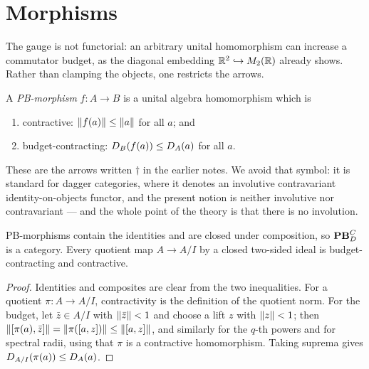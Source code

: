 \section{Morphisms}
\label{sec:morphisms}

The gauge is not functorial: an arbitrary unital homomorphism can increase a
commutator budget, as the diagonal embedding $\mathbb{R}^2\hookrightarrow M_2(\mathbb{R})$
already shows.  Rather than clamping the objects, one restricts the arrows.

\begin{definition}[PB-morphisms]\label{def:pb-morphism}
A \emph{PB-morphism} $f:A\to B$ is a unital algebra homomorphism which is
\begin{enumerate}
\item[(i)] contractive: $\left\lVert f(a)\right\rVert\le\left\lVert a\right\rVert$ for all $a$; and
\item[(ii)] budget-contracting: $D_B(f(a))\le D_A(a)$ for all $a$.
\end{enumerate}
\end{definition}

\begin{remark}[Terminology]
These are the arrows written $\dagger$ in the earlier notes.  We avoid that
symbol: it is standard for dagger categories, where it denotes an involutive
contravariant identity-on-objects functor, and the present notion is neither
involutive nor contravariant --- and the whole point of the theory is that
there is no involution.
\end{remark}

\begin{proposition}\label{prop:category}
PB-morphisms contain the identities and are closed under composition, so
$\mathbf{PB}^C_D$ is a category.  Every quotient map $A\to A/I$ by a closed
two-sided ideal is budget-contracting and contractive.
\end{proposition}

\begin{proof}
Identities and composites are clear from the two inequalities.  For a quotient
$\pi:A\to A/I$, contractivity is the definition of the quotient norm.  For the
budget, let $\bar z\in A/I$ with $\left\lVert\bar z\right\rVert<1$ and choose a lift $z$ with
$\left\lVert z\right\rVert<1$; then
$\left\lVert[\pi(a),\bar z]\right\rVert=\left\lVert\pi([a,z])\right\rVert\le\left\lVert[a,z]\right\rVert$, and similarly for
the $q$-th powers and for spectral radii, using that $\pi$ is a contractive
homomorphism.  Taking suprema gives
$D_{A/I}(\pi(a))\le D_A(a)$.
\end{proof}

